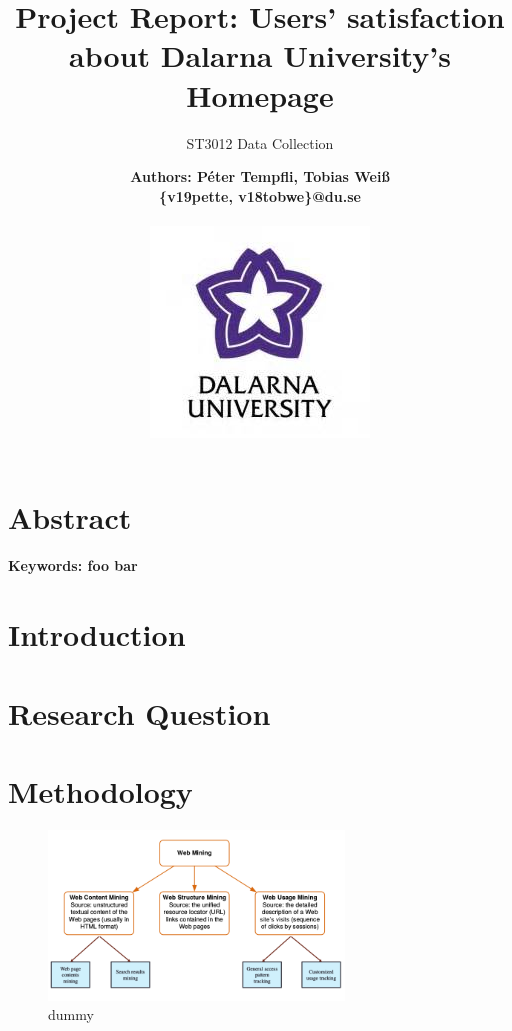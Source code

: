 \documentclass[12pt,a4paper,paper=a4,oneside,titlepage,pdftex]{scrartcl}
\begin{document}
	

\title{Project Report: Users' satisfaction about Dalarna University's Homepage}
\subtitle{ST3012 Data Collection}
\author{
	\bfseries\Large Authors: Péter Tempfli, Tobias Weiß\\
	\{v19pette, v18tobwe\}@du.se
	\\ \\
	\includegraphics[]{figures/du-logo.jpg}\\
}

\maketitle
\tableofcontents
\vspace{25px}

\section{Abstract}
\lipsum[1]
\vspace{10px}
\textbf{Keywords: foo bar}

\section{Introduction}
\lipsum[2-5] \cite{Turban:2010:DSB:1840968}

\section{Research Question}
\lipsum[5-10]

\section{Methodology}


\begin{figure}[H]
    \centering
    \includegraphics[width=0.7\textwidth]{figures/typed-of-webmining.png}
    \caption{dummy}
    \label{fig:XXX}
\end{figure}
\end{document}
